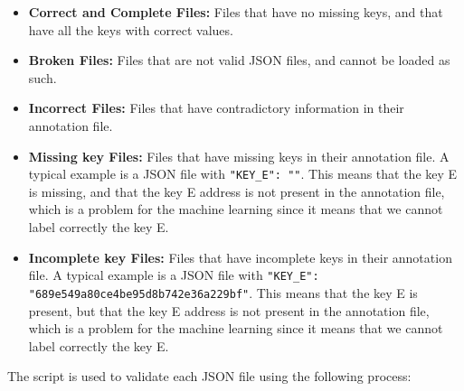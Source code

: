     \begin{itemize}
        \item \textbf{Correct and Complete Files:} Files that have no missing keys, and that have all the keys with correct values.
        \item \textbf{Broken Files:} Files that are not valid JSON files, and cannot be loaded as such.
        \item \textbf{Incorrect Files:} Files that have contradictory information in their annotation file.
        \item \textbf{Missing key Files:} Files that have missing keys in their annotation file. A typical example is a JSON file with \lstinline[style=json]!"KEY_E": ""!. This means that the key E is missing, and that the key E address is not present in the annotation file, which is a problem for the machine learning since it means that we cannot label correctly the key E.
        \item \textbf{Incomplete key Files:} Files that have incomplete keys in their annotation file. A typical example is a JSON file with \lstinline[style=json]!"KEY_E": "689e549a80ce4be95d8b742e36a229bf"!. This means that the key E is present, but that the key E address is not present in the annotation file, which is a problem for the machine learning since it means that we cannot label correctly the key E.
    \end{itemize}

    The script is used to validate each JSON file using the following process:

